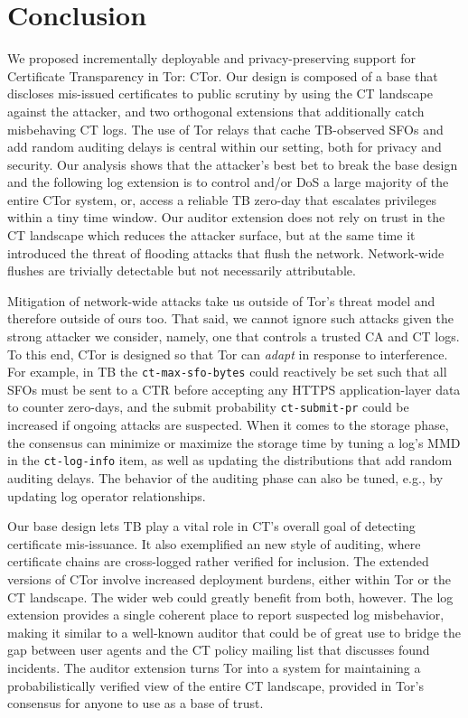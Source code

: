 \section{Conclusion} \label{sec:conclusion}
We proposed incrementally deployable and privacy-preserving support for
Certificate Transparency in Tor: CTor.  Our design is composed of a base that
discloses mis-issued certificates to public scrutiny by using the CT
landscape against the attacker, and two orthogonal extensions that additionally
catch misbehaving CT logs.  The use of Tor relays that cache TB-observed
SFOs and add random auditing delays is central within our setting, both for
privacy and security.  Our analysis shows that the attacker's best bet to break
the base design and the following log extension is to control and/or DoS a large
majority of the entire CTor system, or, access a reliable TB zero-day that
escalates privileges within a tiny time window.  Our auditor extension does
not rely on trust in the CT landscape which reduces the attacker surface, but
at the same time it introduced the threat of flooding attacks that flush the
network.  Network-wide flushes are trivially detectable but not necessarily
attributable.

Mitigation of network-wide attacks take us outside of Tor's threat model and
therefore outside of ours too.  That said, we cannot ignore such attacks given
the strong attacker we consider, namely, one that controls a trusted CA and
CT logs.  To this end, CTor is designed so that Tor can \emph{adapt} in response
to interference.  For example, in TB the \texttt{ct-max-sfo-bytes} could
reactively be set such that all SFOs must be sent to a CTR before accepting any
HTTPS application-layer data to counter zero-days, and the submit probability
\texttt{ct-submit-pr} could be increased if ongoing attacks are suspected.  When
it comes to the storage phase, the consensus can minimize or maximize the
storage time by tuning a log's MMD in the \texttt{ct-log-info} item, as well as
updating the distributions that add random auditing delays.  The behavior of the
auditing phase can also be tuned, e.g., by updating log operator relationships.

Our base design lets TB play a vital role in CT's overall goal of detecting
certificate mis-issuance.  It also exemplified an new style of auditing, where
certificate chains are cross-logged rather verified for inclusion.  The extended
versions of CTor involve increased deployment burdens, either within Tor or the
CT landscape.  The wider web could greatly benefit from both, however.  The log
extension provides a single coherent place to report suspected log misbehavior,
making it similar to a well-known auditor that could be of great use to bridge
the gap between user agents and the CT policy mailing list that discusses found
incidents.  The auditor extension turns Tor into a system for maintaining a
probabilistically verified view of the entire CT landscape, provided in Tor's
consensus for anyone to use as a base of trust.
